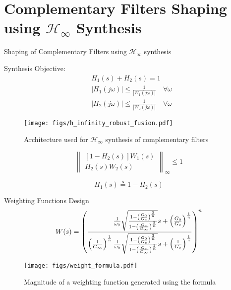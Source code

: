 \documentclass[t]{clean-beamer}
\begin{document}
\section{Complementary Filters Shaping using \(\mathcal{H}_\infty\) Synthesis}
\label{sec:org727d73b}
\label{sec:hinf_method}
\begin{frame}[label={sec:org3adefc5}]{Shaping of Complementary Filters using \(\mathcal{H}_\infty\) synthesis}
\label{sec:hinf_synthesis}

Synthesis Objective:
\begin{subequations}
\label{eq:comp_filter_problem_form}
  \begin{align}
  & H_1(s) + H_2(s) = 1 \label{eq:hinf_cond_complementarity} \\
  & |H_1(j\omega)| \le \frac{1}{|W_1(j\omega)|} \quad \forall\omega \label{eq:hinf_cond_h1} \\
  & |H_2(j\omega)| \le \frac{1}{|W_2(j\omega)|} \quad \forall\omega \label{eq:hinf_cond_h2}
  \end{align}
\end{subequations}

\begin{figure}[htbp]
\centering
\texttt{[image: figs/h\_infinity\_robust\_fusion.pdf]}
\caption{\label{fig:h_infinity_robust_fusion}
Architecture used for \(\mathcal{H}_\infty\) synthesis of complementary filters}
\end{figure}

\begin{equation}
\label{eq:hinf_syn_obj}
  \left\|\begin{matrix} \left[1 - H_2(s)\right] W_1(s) \\ H_2(s) W_2(s) \end{matrix}\right\|_\infty \le 1
\end{equation}

\begin{equation}
\label{eq:definition_H1}
  H_1(s) \triangleq 1 - H_2(s)
\end{equation}
\end{frame}

\begin{frame}[label={sec:org90726d8}]{Weighting Functions Design}
\label{sec:hinf_weighting_func}
\begin{equation}
\label{eq:weight_formula}
  W(s) = \left( \frac{
           \hfill{} \frac{1}{\omega_0} \sqrt{\frac{1 - \left(\frac{G_0}{G_c}\right)^{\frac{2}{n}}}{1 - \left(\frac{G_c}{G_\infty}\right)^{\frac{2}{n}}}} s + \left(\frac{G_0}{G_c}\right)^{\frac{1}{n}}
         }{
           \left(\frac{1}{G_\infty}\right)^{\frac{1}{n}} \frac{1}{\omega_0} \sqrt{\frac{1 - \left(\frac{G_0}{G_c}\right)^{\frac{2}{n}}}{1 - \left(\frac{G_c}{G_\infty}\right)^{\frac{2}{n}}}} s + \left(\frac{1}{G_c}\right)^{\frac{1}{n}}
         }\right)^n
\end{equation}

\begin{figure}[htbp]
\centering
\texttt{[image: figs/weight\_formula.pdf]}
\caption{\label{fig:weight_formula}
Magnitude of a weighting function generated using the formula}
\end{figure}
\end{frame}
\end{document}
